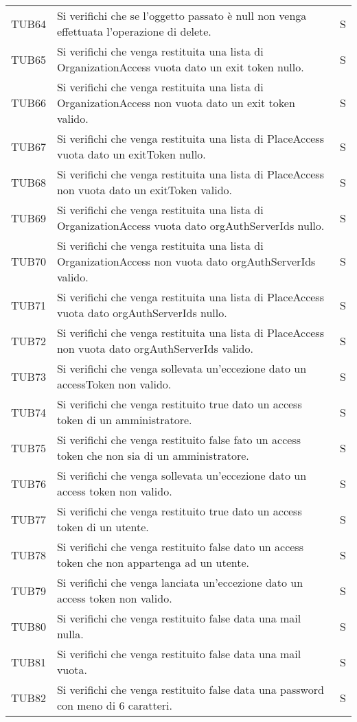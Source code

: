 {\begin{longtable}{ c C{13cm} C{1cm}}
TUB64 & Si verifichi che se l'oggetto passato è null non venga effettuata l'operazione di delete. & S \\
TUB65 & Si verifichi che venga restituita una lista di OrganizationAccess vuota dato un exit token nullo. & S \\
TUB66 & Si verifichi che venga restituita una lista di OrganizationAccess non vuota dato un exit token valido. & S \\
TUB67 & Si verifichi che venga restituita una lista di PlaceAccess vuota dato un exitToken nullo. & S \\
TUB68 & Si verifichi che venga restituita una lista di PlaceAccess non vuota dato un exitToken valido. & S \\
TUB69 & Si verifichi che venga restituita una lista di OrganizationAccess vuota dato orgAuthServerIds nullo. & S \\
TUB70 & Si verifichi che venga restituita una lista di OrganizationAccess non vuota dato orgAuthServerIds valido. & S \\
TUB71 & Si verifichi che venga restituita una lista di PlaceAccess vuota dato orgAuthServerIds nullo. & S \\
TUB72 & Si verifichi che venga restituita una lista di PlaceAccess non vuota dato orgAuthServerIds valido. & S \\
TUB73 & Si verifichi che venga sollevata un'eccezione dato un accessToken non valido. & S \\
TUB74 & Si verifichi che venga restituito true dato un access token di un amministratore. & S \\
TUB75 & Si verifichi che venga restituito false fato un access token che non sia di un amministratore. & S \\
TUB76 & Si verifichi che venga sollevata un'eccezione dato un access token non valido. & S \\
TUB77 & Si verifichi che venga restituito true dato un access token di un utente. & S \\
TUB78 & Si verifichi che venga restituito false dato un access token che non appartenga ad un utente. & S \\
TUB79 & Si verifichi che venga lanciata un'eccezione dato un access token non valido. & S \\
TUB80 & Si verifichi che venga restituito false data una mail nulla. & S \\
TUB81 & Si verifichi che venga restituito false data una mail vuota. & S \\
TUB82 & Si verifichi che venga restituito false data una password con meno di 6 caratteri. & S \\

\end{longtable}}

